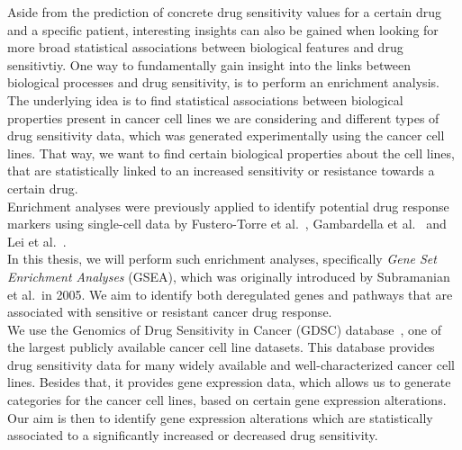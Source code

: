 Aside from the prediction of concrete drug sensitivity values for a certain drug and a specific patient, interesting insights can also be gained when looking for more broad statistical associations between biological features and drug sensitivtiy.
One way to fundamentally gain insight into the links between biological processes and drug sensitivity, is to perform an enrichment analysis.
The underlying idea is to find statistical associations between biological properties present in cancer cell lines we are considering and different types of drug sensitivity data, which was generated experimentally using the cancer cell lines.
That way, we want to find certain biological properties about the cell lines, that are statistically linked to an increased sensitivity or resistance towards a certain drug.\\
Enrichment analyses were previously applied to identify potential drug response markers using single-cell data by Fustero-Torre et al.~\cite{scea_beyondcell}, Gambardella et al.~\cite{scea_gambardella} and Lei et al.~\cite{scea_lei}.\\
In this thesis, we will perform such enrichment analyses, specifically \textit{Gene Set Enrichment Analyses} (GSEA), which was originally introduced by Subramanian et al.\ in 2005. We aim to identify both deregulated genes and pathways that are associated with sensitive or resistant cancer drug response.\\
We use the Genomics of Drug Sensitivity in Cancer (GDSC) database~\cite{gdsc}, one of the largest publicly available cancer cell line datasets. This database provides drug sensitivity data for many widely available and well-characterized cancer cell lines. Besides that, it provides gene expression data, which allows us to generate categories for the cancer cell lines, based on certain gene expression alterations.
Our aim is then to identify gene expression alterations which are statistically associated to a significantly increased or decreased drug sensitivity.


